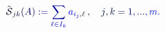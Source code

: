\documentclass[12pt]{article}
\begin{document}
\makeatletter
\renewcommand*{\@textcolor}[3]{%
  \protect\leavevmode
  \begingroup
    \color#1{#2}#3%
  \endgroup
}
\makeatother
\begin{displaymath}
{\mathcolor[RGB]{0,0,15}{\tilde { \mathcal { \mathcolor[RGB]{0,0,30}{S} } } }} _ { \mathcolor[RGB]{0,0,45}{j} \mathcolor[RGB]{0,0,60}{k} } \mathcolor[RGB]{0,0,75}{(} \mathcolor[RGB]{0,0,90}{A} \mathcolor[RGB]{0,0,105}{)} \mathcolor[RGB]{0,0,120}{:} \mathcolor[RGB]{0,0,135}{=} \mathcolor[RGB]{0,0,150}{\sum} _ { \mathcolor[RGB]{0,0,165}{\ell} \mathcolor[RGB]{0,0,180}{\in} \mathcolor[RGB]{0,0,195}{I} _ { \mathcolor[RGB]{0,0,210}{k} } } \mathcolor[RGB]{0,0,225}{a} _ { \mathcolor[RGB]{0,0,240}{i} _ { \mathcolor[RGB]{0,0,255}{j} } \mathcolor[RGB]{0,15,0}{,} \mathcolor[RGB]{0,15,15}{\ell} } \, \mathcolor[RGB]{0,15,30}{,} \quad \mathcolor[RGB]{0,15,45}{j} \mathcolor[RGB]{0,15,60}{,} \mathcolor[RGB]{0,15,75}{k} \mathcolor[RGB]{0,15,90}{=} \mathcolor[RGB]{0,15,105}{1} \mathcolor[RGB]{0,15,120}{,} \mathcolor[RGB]{0,15,135}{.} \mathcolor[RGB]{0,15,150}{.} \mathcolor[RGB]{0,15,165}{.} \mathcolor[RGB]{0,15,180}{,} \mathcolor[RGB]{0,15,195}{m} \mathcolor[RGB]{0,15,210}{.}
\end{displaymath}
\end{document}

